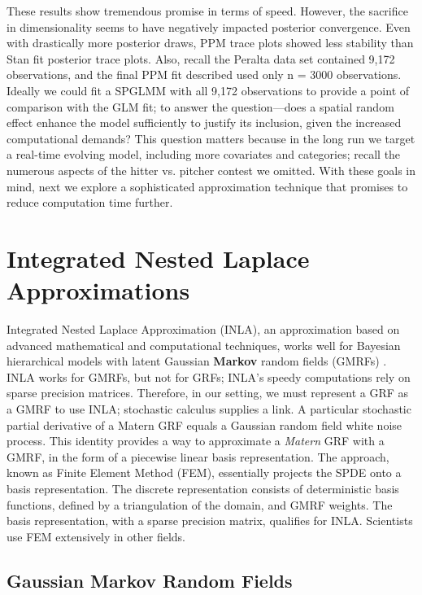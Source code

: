 These results show tremendous promise in terms of speed. However, the sacrifice in dimensionality seems to have negatively impacted posterior convergence. Even with drastically more posterior draws, PPM trace plots showed less stability than Stan
fit posterior trace plots. Also, recall the Peralta data set contained 9,172 observations, and the final PPM fit described used only n = 3000 observations. Ideally we could fit a SPGLMM with all 9,172 observations to provide a point of comparison with the GLM fit; to answer the question---does a spatial random effect enhance the model sufficiently to justify its inclusion, given the increased computational demands? This question matters because in the long run we target a real-time evolving model, including more covariates and categories; recall the numerous aspects of the hitter vs. pitcher contest we omitted. With these goals in mind, next we explore a sophisticated approximation technique that promises to  reduce computation time further.

\section{Integrated Nested Laplace Approximations} %
Integrated Nested Laplace Approximation (INLA), an approximation  based on advanced mathematical and computational techniques, works well for Bayesian hierarchical models with latent Gaussian {\bf Markov} random fields (GMRFs) \citep{Rue2007}. INLA works for GMRFs, but not for GRFs; INLA's speedy computations rely on sparse precision matrices. Therefore, in our setting, we must represent a GRF as a GMRF to use INLA; stochastic calculus supplies a link. A particular stochastic partial derivative of a Matern GRF equals a Gaussian random field white noise process. This identity provides a way to approximate a {\it Matern} GRF with a GMRF, in the form of a piecewise linear basis representation. The approach, known as Finite Element Method (FEM), essentially projects the SPDE onto a basis representation. The discrete representation consists of deterministic basis functions, defined by a triangulation of the domain, and GMRF weights. The basis representation, with a sparse precision matrix, qualifies for INLA. Scientists use FEM extensively in other fields.

\subsection{Gaussian Markov Random Fields}

